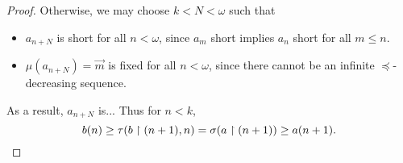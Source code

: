 \documentclass[11pt]{article}
\theoremstyle{plain}
\theoremstyle{definition}
\theoremstyle{remark}
\theoremstyle{plain}
\theoremstyle{definition}
\theoremstyle{remark}
\begin{document}
\begin{proof}
    Otherwise, we may choose \(k<N<\omega\) such that
      \begin{itemize}
        \item \(a_{n+N}\) is short for all \(n<\omega\),
              since \(a_m\) short implies \(a_n\) short for all \(m\leq n\).
        \item \(\mu(a_{n+N})=\vec m\) is fixed for all \(n<\omega\), since
              there cannot be an infinite \(\preceq\)-decreasing sequence.
      \end{itemize}
    As a result, \(a_{n+N}\) is...
    Thus for \(n<k\),
    \[
      b(n)
        \geq
      \tau(b\restriction(n+1),n)
        =
      \sigma(a\restriction(n+1))
        \geq
      a(n+1)
    .\]

  \end{proof}
\end{document}
